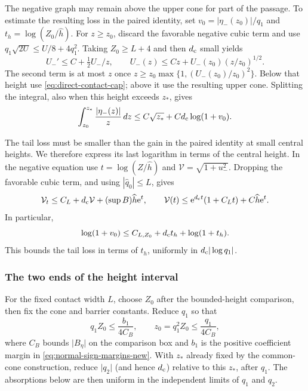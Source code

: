 The negative graph may remain above the upper cone for part of the
passage. To estimate the resulting loss in the paired identity, set
\(v_0=|\eta_-(z_0)|/q_1\) and
\(t_h=\log(Z_0/\widehat h)\). For \(z\ge z_0\), discard the favorable
negative cubic term and use
\(q_1\sqrt{2U}\le U/8+4q_1^2\). Taking \(Z_0\ge L+4\)
and then \(d_{\rm c}\) small yields
\begin{equation}
\label{eq:direct-contact-upper-comparison}
 U_-'\le C+\tfrac12 U_-/z,\qquad
 U_-(z)\le Cz+U_-(z_0)(z/z_0)^{1/2}.
\end{equation}
The second term is at most \(z\) once
\(z\ge z_0\max\{1,(U_-(z_0)/z_0)^2\}\).
Below that height use \eqref{eq:direct-contact-cap}; above it use
the resulting upper cone. Splitting the integral, also when this
height exceeds \(z_*\), gives
\begin{equation}
\label{eq:direct-contact-tail-loss}
 \int_{z_0}^{z_*}\frac{|\eta_-(z)|}{z}\,dz
       \le C\sqrt{z_*}+Cd_{\rm c}\log(1+v_0).
\end{equation}

The tail loss must be smaller than the gain in the paired identity
at small central heights. We therefore express its last logarithm in
terms of the central height. In the
negative equation use \(t=\log(Z/\widehat h)\) and
\(\mathcal V=\sqrt{1+u_-^2}\). Dropping the favorable cubic
term, and using \(|\widehat q_0|\le L\), gives
\[
 \mathcal V_t\le C_L+d_{\rm c}\mathcal V+(\sup B)\widehat h \mathrm e^t,\qquad
 \mathcal V(t)\le \mathrm e^{d_{\rm c}t}(1+C_Lt)+C\widehat h \mathrm e^t .
\]
In particular,
\begin{equation}
\label{eq:direct-contact-source-growth}
 \log(1+v_0)\le C_{L,Z_0}+d_{\rm c}t_h+\log(1+t_h).
\end{equation}
This bounds the tail loss in terms of \(t_h\), uniformly
in \(d_{\rm c}|\log q_1|\).

\subsubsection{The two ends of the height interval}

For the fixed contact width \(L\), choose \(Z_0\) after the bounded-height
comparison, then fix the cone and barrier constants. Reduce \(q_1\)
so that
\begin{equation}
\label{eq:direct-contact-prefix-absorption-choice}
 q_1Z_0\le \frac{b_1}{4C_B},
 \qquad z_0=q_1^2Z_0\le \frac{q_1}{4C_B},
\end{equation}
where \(C_B\) bounds \(\lvert B_\eta\rvert\) on the comparison box and
\(b_1\) is the positive coefficient margin in
\eqref{eq:normal-sign-margins-new}. With \(z_*\) already fixed by the
common-cone construction, reduce \(\lvert q_2\rvert\) (and hence
\(d_{\rm c}\)) relative to this \(z_*\), after \(q_1\). The absorptions
below are then uniform in the independent limits of \(q_1\) and \(q_2\).


